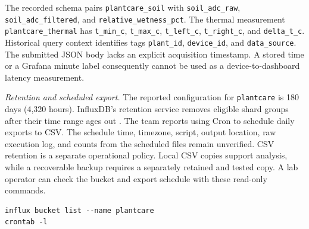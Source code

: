 \documentclass{ieeeaccess}
\newcommand{\code}[1]{\texttt{#1}}
\begin{document}
The recorded schema pairs \code{plantcare\_soil} with \code{soil\_adc\_raw}, \code{soil\_adc\_filtered}, and \code{relative\_wetness\_pct}. The thermal measurement \code{plantcare\_thermal} has \code{t\_min\_c}, \code{t\_max\_c}, \code{t\_left\_c}, \code{t\_right\_c}, and \code{delta\_t\_c}. Historical query context identifies tags \code{plant\_id}, \code{device\_id}, and \code{data\_source}. The submitted JSON body lacks an explicit acquisition timestamp. A stored time or a Grafana minute label consequently cannot be used as a device-to-dashboard latency measurement.

\emph{Retention and scheduled export.} The reported configuration for \code{plantcare} is 180 days (4,320 hours). InfluxDB's retention service removes eligible shard groups after their time range ages out \cite{retention}. The team reports using Cron to schedule daily exports to CSV. The schedule time, timezone, script, output location, raw execution log, and counts from the scheduled files remain unverified. CSV retention is a separate operational policy. Local CSV copies support analysis, while a recoverable backup requires a separately retained and tested copy. A lab operator can check the bucket and export schedule with these read-only commands.
{\footnotesize
\begin{verbatim}
influx bucket list --name plantcare
crontab -l
\end{verbatim}
}
\end{document}
